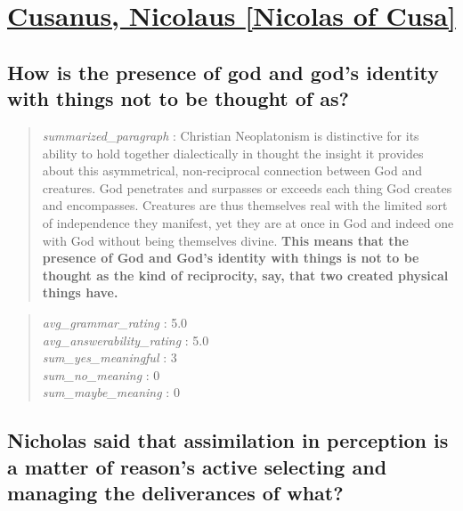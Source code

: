\hypertarget{cusanus-nicolaus-nicolas-of-cusa}{%
\section{\texorpdfstring{\href{https://plato.stanford.edu/entries/cusanus/index.html}{Cusanus,
Nicolaus {[}Nicolas of
Cusa{]}}}{Cusanus, Nicolaus {[}Nicolas of Cusa{]}}}\label{cusanus-nicolaus-nicolas-of-cusa}}

\hypertarget{how-is-the-presence-of-god-and-gods-identity-with-things-not-to-be-thought-of-as}{%
\subsection{How is the presence of god and god's identity with things
not to be thought of
as?}\label{how-is-the-presence-of-god-and-gods-identity-with-things-not-to-be-thought-of-as}}

\begin{quote}
\emph{summarized\_paragraph} : Christian Neoplatonism is distinctive for
its ability to hold together dialectically in thought the insight it
provides about this asymmetrical, non-reciprocal connection between God
and creatures. God penetrates and surpasses or exceeds each thing God
creates and encompasses. Creatures are thus themselves real with the
limited sort of independence they manifest, yet they are at once in God
and indeed one with God without being themselves divine. \textbf{This
means that the presence of God and God's identity with things is not to
be thought as the kind of reciprocity, say, that two created physical
things have.}
\end{quote}

\begin{quote}
\emph{avg\_grammar\_rating} : 5.0\\
\emph{avg\_answerability\_rating} : 5.0\\
\emph{sum\_yes\_meaningful} : 3\\
\emph{sum\_no\_meaning} : 0\\
\emph{sum\_maybe\_meaning} : 0
\end{quote}

\hypertarget{nicholas-said-that-assimilation-in-perception-is-a-matter-of-reasons-active-selecting-and-managing-the-deliverances-of-what}{%
\subsection{Nicholas said that assimilation in perception is a matter of
reason's active selecting and managing the deliverances of
what?}\label{nicholas-said-that-assimilation-in-perception-is-a-matter-of-reasons-active-selecting-and-managing-the-deliverances-of-what}}

